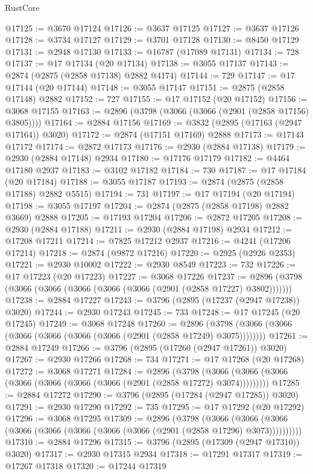 \begin{lexlean}{RustCore}
\begin{coremodule}
@17125 := @3670 @17124
@17126 := @3637 @17125
@17127 := @3637 @17126
@17128 := @3734 @17127
@17129 := @3701 @17128
@17130 := @8450 @17129
@17131 := @2948 @17130
@17133 := @16787 (@17089 @17131)
@17134 := 728
@17137 := @17 @17134 (@20 @17134)
@17138 := @3055 @17137
@17143 := @2874 (@2875 (@2858 @17138) @2882 @4174)
@17144 := 729
@17147 := @17 @17144 (@20 @17144)
@17148 := @3055 @17147
@17151 := @2875 (@2858 @17148) @2882
@17152 := 727
@17155 := @17 @17152 (@20 @17152)
@17156 := @3068 @17155
@17163 := @2896 (@3798 (@3066 (@3066 (@2901 (@2858 @17156) @3805))))
@17164 := @2884 @17156
@17169 := @3832 (@2895 (@17163 (@2947 @17164)) @3020)
@17172 := @2874 (@17151 @17169) @2888
@17173 := @17143 @17172
@17174 := @2872 @17173
@17176 := @2930 (@2884 @17138)
@17179 := @2930 (@2884 @17148) @2934
@17180 := @17176 @17179
@17182 := @4464 @17180 @2937
@17183 := @3102 @17182
@17184 := 730
@17187 := @17 @17184 (@20 @17184)
@17188 := @3055 @17187
@17193 := @2874 (@2875 (@2858 @17188) @2882 @5515)
@17194 := 731
@17197 := @17 @17194 (@20 @17194)
@17198 := @3055 @17197
@17204 := @2874 (@2875 (@2858 @17198) @2882 @3669) @2888
@17205 := @17193 @17204
@17206 := @2872 @17205
@17208 := @2930 (@2884 @17188)
@17211 := @2930 (@2884 @17198) @2934
@17212 := @17208 @17211
@17214 := @7825 @17212 @2937
@17216 := @4241 (@17206 @17214)
@17218 := @2874 (@9872 @17216)
@17220 := @2925 (@2926 @2353)
@17221 := @2930 @10002
@17222 := @2930 @8549
@17223 := 732
@17226 := @17 @17223 (@20 @17223)
@17227 := @3068 @17226
@17237 := @2896 (@3798 (@3066 (@3066 (@3066 (@3066 (@3066 (@2901 (@2858 @17227) @3802)))))))
@17238 := @2884 @17227
@17243 := @3796 (@2895 (@17237 (@2947 @17238)) @3020)
@17244 := @2930 @17243
@17245 := 733
@17248 := @17 @17245 (@20 @17245)
@17249 := @3068 @17248
@17260 := @2896 (@3798 (@3066 (@3066 (@3066 (@3066 (@3066 (@3066 (@2901 (@2858 @17249) @3075))))))))
@17261 := @2884 @17249
@17266 := @3796 (@2895 (@17260 (@2947 @17261)) @3020)
@17267 := @2930 @17266
@17268 := 734
@17271 := @17 @17268 (@20 @17268)
@17272 := @3068 @17271
@17284 := @2896
    (@3798 (@3066 (@3066 (@3066 (@3066 (@3066 (@3066 (@3066 (@2901 (@2858 @17272) @3074)))))))))
@17285 := @2884 @17272
@17290 := @3796 (@2895 (@17284 (@2947 @17285)) @3020)
@17291 := @2930 @17290
@17292 := 735
@17295 := @17 @17292 (@20 @17292)
@17296 := @3068 @17295
@17309 := @2896
    (@3798
      (@3066 (@3066 (@3066 (@3066 (@3066 (@3066 (@3066 (@3066 (@2901 (@2858 @17296) @3073))))))))))
@17310 := @2884 @17296
@17315 := @3796 (@2895 (@17309 (@2947 @17310)) @3020)
@17317 := @2930 @17315 @2934
@17318 := @17291 @17317
@17319 := @17267 @17318
@17320 := @17244 @17319

\end{coremodule}
\end{lexlean}
